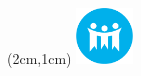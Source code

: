 \documentclass[12pt,a4paper]{article}
\begin{document}
\textblockorigin{-18pt}{-2pt}
\begin{textblock*}{10cm}(2cm,1cm)
\includegraphics[width=1.5cm]{logo.png}
\end{textblock*}



\end{document}
